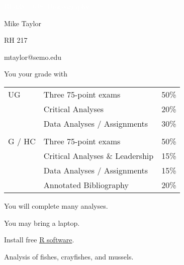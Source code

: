 \documentclass[t]{beamer}
\begin{document}


{
\begin{frame}[b,plain]{\textcolor{white}{BI 438 / 638: Biogeography}}

\end{frame}
}

{
\begin{frame}[t,plain]
\large
\vspace{5ex}
\hangpara\hspace{17em} Mike Taylor

\hangpara\hspace{17em} RH 217

\hangpara\hspace{17em} mtaylor@semo.edu

\end{frame}
}

\begin{frame}[t]{You  your grade with}
	\begin{center}\large\begin{tabular}{@{}lll@{}}
	UG		&	Three 75-point exams 				& 	50\% \\
			&	Critical Analyses					& 	20\% \\
			&	Data Analyses / Assignments			& 	30\% \\
			&										&	\\
	G / HC	&	Three 75-point exams 				& 	50\% \\
			&	Critical Analyses \& Leadership		& 	15\% \\
			&	Data Analyses / Assignments 		&	15\% \\
			&	Annotated Bibliography 				&	20\% \\
		\end{tabular}
	\end{center}
\end{frame}

{
\begin{frame}[t,plain]{You will complete many analyses.}

	\hangpara You may bring a laptop.
	
	\hangpara Install free \href{https://www.r-project.org/}{R software}.
	
	\hangpara Analysis of fishes, crayfishes, and mussels.

\end{frame}
}
\end{document}
